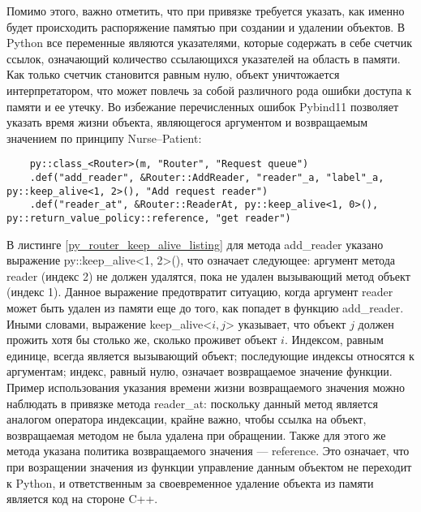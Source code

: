  Помимо этого, важно отметить, что при привязке требуется указать, как именно будет происходить распоряжение памятью при создании и удалении объектов. В Python все переменные являются указателями, которые содержать в себе счетчик ссылок, означающий количество ссылающихся указателей на область в памяти. Как только счетчик становится равным нулю, объект уничтожается интерпретатором, что может повлечь за собой различного рода ошибки доступа к памяти и ее утечку. Во избежание перечисленных ошибок Pybind11 позволяет указать время жизни объекта, являющегося аргументом и возвращаемым значением по принципу Nurse--Patient:
 
 \begin{lstlisting}
 	py::class_<Router>(m, "Router", "Request queue")
 	.def("add_reader", &Router::AddReader, "reader"_a, "label"_a, py::keep_alive<1, 2>(), "Add request reader")
 	.def("reader_at", &Router::ReaderAt, py::keep_alive<1, 0>(), py::return_value_policy::reference, "get reader")
 \end{lstlisting}

В листинге \ref{py_router_keep_alive_listing} для метода add\_reader указано выражение py::keep\_alive<1, 2>(), что означает следующее: аргумент метода reader (индекс 2) не должен удалятся, пока не удален вызывающий метод объект (индекс 1). Данное выражение предотвратит ситуацию, когда аргумент reader может быть удален из памяти еще до того, как попадет в функцию add\_reader. Иными словами, выражение keep\_alive<$i,j$> указывает, что объект $j$ должен прожить хотя бы столько же, сколько проживет объект $i$. Индексом, равным единице, всегда является вызывающий объект; последующие индексы относятся к аргументам; индекс, равный нулю, означает возвращаемое значение функции. Пример использования указания времени жизни возвращаемого значения можно наблюдать в привязке метода reader\_at: поскольку данный метод является аналогом оператора индексации, крайне важно, чтобы ссылка на объект, возвращаемая методом не была удалена при обращении. Также для этого же метода указана политика возвращаемого значения --- reference. Это означает, что при возращении значения из функции управление данным объектом не переходит к Python, и ответственным за своевременное удаление объекта из памяти является код на стороне C++.

